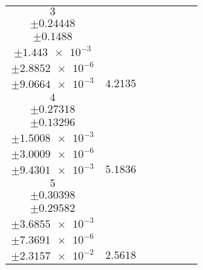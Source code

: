 \documentclass[8pt]{article}
\begin{document}
\begin{longtable}[l]{c c c c c c c}
$\num{3}$ & \begin{tabular}[c]{@{}c@{}}$\num{94.14}$ \\ $\pm\num{0.24448}$\end{tabular} & \begin{tabular}[c]{@{}c@{}}$\num{1.2418}$ \\ $\pm\num{0.1488}$\end{tabular} & \begin{tabular}[c]{@{}c@{}}$\num{3.3141e+3}$ \\ $\pm\num{1.443e-3}$\end{tabular} & \begin{tabular}[c]{@{}c@{}}$\num{6.6264}$ \\ $\pm\num{2.8852e-6}$\end{tabular} & \begin{tabular}[c]{@{}c@{}}$\num{5.0848}$ \\ $\pm\num{9.0664e-3}$\end{tabular} & $\num{4.2135}$\\
$\num{4}$ & \begin{tabular}[c]{@{}c@{}}$\num{117.72}$ \\ $\pm\num{0.27318}$\end{tabular} & \begin{tabular}[c]{@{}c@{}}$\num{0.8198}$ \\ $\pm\num{0.13296}$\end{tabular} & \begin{tabular}[c]{@{}c@{}}$\num{3.3158e+3}$ \\ $\pm\num{1.5008e-3}$\end{tabular} & \begin{tabular}[c]{@{}c@{}}$\num{6.6299}$ \\ $\pm\num{3.0009e-6}$\end{tabular} & \begin{tabular}[c]{@{}c@{}}$\num{5.8845}$ \\ $\pm\num{9.4301e-3}$\end{tabular} & $\num{5.1836}$\\
$\num{5}$ & \begin{tabular}[c]{@{}c@{}}$\num{58.877}$ \\ $\pm\num{0.30398}$\end{tabular} & \begin{tabular}[c]{@{}c@{}}$\num{0.15939}$ \\ $\pm\num{0.29582}$\end{tabular} & \begin{tabular}[c]{@{}c@{}}$\num{3.3209e+3}$ \\ $\pm\num{3.6855e-3}$\end{tabular} & \begin{tabular}[c]{@{}c@{}}$\num{6.6401}$ \\ $\pm\num{7.3691e-6}$\end{tabular} & \begin{tabular}[c]{@{}c@{}}$\num{6.5374}$ \\ $\pm\num{2.3157e-2}$\end{tabular} & $\num{2.5618}$\\

\end{longtable}
\end{document}
